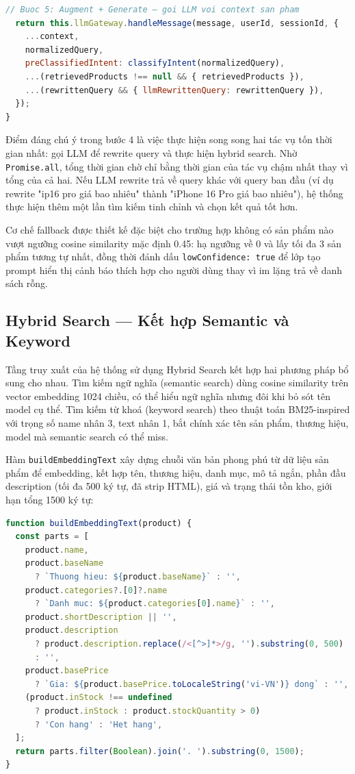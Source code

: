 \begin{lstlisting}[language=JavaScript, caption={RAGPipeline — điều phối toàn bộ luồng RAG (rag-pipeline.js)}]
  // Buoc 5: Augment + Generate — goi LLM voi context san pham
  return this.llmGateway.handleMessage(message, userId, sessionId, {
    ...context,
    normalizedQuery,
    preClassifiedIntent: classifyIntent(normalizedQuery),
    ...(retrievedProducts !== null && { retrievedProducts }),
    ...(rewrittenQuery && { llmRewrittenQuery: rewrittenQuery }),
  });
}
\end{lstlisting}

Điểm đáng chú ý trong bước 4 là việc thực hiện song song hai tác vụ tốn thời gian nhất: gọi LLM để rewrite query và thực hiện hybrid search. Nhờ \texttt{Promise.all}, tổng thời gian chờ chỉ bằng thời gian của tác vụ chậm nhất thay vì tổng của cả hai. Nếu LLM rewrite trả về query khác với query ban đầu (ví dụ rewrite "ip16 pro giá bao nhiêu" thành "iPhone 16 Pro giá bao nhiêu"), hệ thống thực hiện thêm một lần tìm kiếm tinh chỉnh và chọn kết quả tốt hơn.

Cơ chế fallback được thiết kế đặc biệt cho trường hợp không có sản phẩm nào vượt ngưỡng cosine similarity mặc định 0.45: hạ ngưỡng về 0 và lấy tối đa 3 sản phẩm tương tự nhất, đồng thời đánh dấu \texttt{lowConfidence: true} để lớp tạo prompt hiển thị cảnh báo thích hợp cho người dùng thay vì im lặng trả về danh sách rỗng.

\subsection{Hybrid Search — Kết hợp Semantic và Keyword}

Tầng truy xuất của hệ thống sử dụng Hybrid Search kết hợp hai phương pháp bổ sung cho nhau. Tìm kiếm ngữ nghĩa (semantic search) dùng cosine similarity trên vector embedding 1024 chiều, có thể hiểu ngữ nghĩa nhưng đôi khi bỏ sót tên model cụ thể. Tìm kiếm từ khoá (keyword search) theo thuật toán BM25-inspired với trọng số name nhân 3, text nhân 1, bắt chính xác tên sản phẩm, thương hiệu, model mà semantic search có thể miss.

Hàm \texttt{buildEmbeddingText} xây dựng chuỗi văn bản phong phú từ dữ liệu sản phẩm để embedding, kết hợp tên, thương hiệu, danh mục, mô tả ngắn, phần đầu description (tối đa 500 ký tự, đã strip HTML), giá và trạng thái tồn kho, giới hạn tổng 1500 ký tự:

\begin{lstlisting}[language=JavaScript, caption={buildEmbeddingText — xây dựng text để embedding (vector-store.js)}]
function buildEmbeddingText(product) {
  const parts = [
    product.name,
    product.baseName
      ? `Thuong hieu: ${product.baseName}` : '',
    product.categories?.[0]?.name
      ? `Danh muc: ${product.categories[0].name}` : '',
    product.shortDescription || '',
    product.description
      ? product.description.replace(/<[^>]*>/g, '').substring(0, 500)
      : '',
    product.basePrice
      ? `Gia: ${product.basePrice.toLocaleString('vi-VN')} dong` : '',
    (product.inStock !== undefined
      ? product.inStock : product.stockQuantity > 0)
      ? 'Con hang' : 'Het hang',
  ];
  return parts.filter(Boolean).join('. ').substring(0, 1500);
}
\end{lstlisting}

